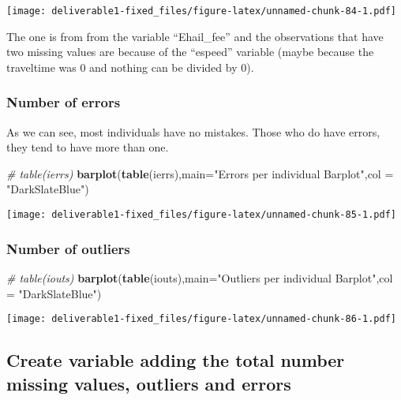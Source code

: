 \documentclass[
  18pt,
  a4paper]{article}
\newenvironment{Shaded}{\begin{snugshade}}{\end{snugshade}}
\newcommand{\CommentTok}[1]{\textcolor[rgb]{0.56,0.35,0.01}{\textit{#1}}}
\newcommand{\DataTypeTok}[1]{\textcolor[rgb]{0.13,0.29,0.53}{#1}}
\newcommand{\KeywordTok}[1]{\textcolor[rgb]{0.13,0.29,0.53}{\textbf{#1}}}
\newcommand{\NormalTok}[1]{#1}
\newcommand{\StringTok}[1]{\textcolor[rgb]{0.31,0.60,0.02}{#1}}
\begin{document}
\texttt{[image: deliverable1-fixed\_files/figure-latex/unnamed-chunk-84-1.pdf]}

The one is from from the variable ``Ehail\_fee'' and the observations
that have two missing values are because of the ``espeed'' variable
(maybe because the traveltime was 0 and nothing can be divided by 0).

\hypertarget{number-of-errors}{%
\subsubsection{Number of errors}\label{number-of-errors}}

As we can see, most individuals have no mistakes. Those who do have
errors, they tend to have more than one.

\begin{Shaded}
\begin{Highlighting}[]
\CommentTok{# table(ierrs)}
\KeywordTok{barplot}\NormalTok{(}\KeywordTok{table}\NormalTok{(ierrs),}\DataTypeTok{main=}\StringTok{"Errors per individual Barplot"}\NormalTok{,}\DataTypeTok{col =} \StringTok{"DarkSlateBlue"}\NormalTok{)}
\end{Highlighting}
\end{Shaded}

\texttt{[image: deliverable1-fixed\_files/figure-latex/unnamed-chunk-85-1.pdf]}

\hypertarget{number-of-outliers}{%
\subsubsection{Number of outliers}\label{number-of-outliers}}

\begin{Shaded}
\begin{Highlighting}[]
\CommentTok{# table(iouts)}
\KeywordTok{barplot}\NormalTok{(}\KeywordTok{table}\NormalTok{(iouts),}\DataTypeTok{main=}\StringTok{"Outliers per individual Barplot"}\NormalTok{,}\DataTypeTok{col =} \StringTok{"DarkSlateBlue"}\NormalTok{)}
\end{Highlighting}
\end{Shaded}

\texttt{[image: deliverable1-fixed\_files/figure-latex/unnamed-chunk-86-1.pdf]}

\hypertarget{create-variable-adding-the-total-number-missing-values-outliers-and-errors}{%
\subsection{Create variable adding the total number missing values,
outliers and
errors}\label{create-variable-adding-the-total-number-missing-values-outliers-and-errors}}
\end{document}
